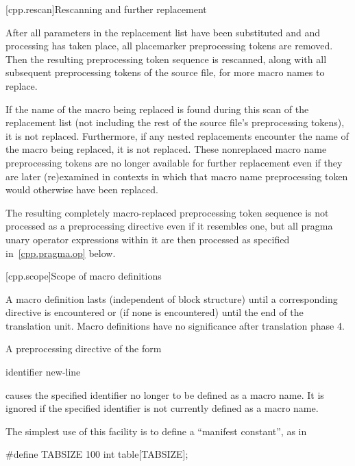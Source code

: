 [cpp.rescan]{Rescanning and further replacement}%
%

\pnum
After all parameters in the replacement list have been substituted and \tcode{\#} and \tcode{\#\#} processing has taken
place, all placemarker preprocessing tokens are removed. Then
the resulting preprocessing token sequence is rescanned, along with all
subsequent preprocessing tokens of the source file, for more macro names
to replace.

\pnum
If the name of the macro being replaced is found during this scan of
the replacement list
(not including the rest of the source file's preprocessing tokens),
it is not replaced.
Furthermore,
if any nested replacements encounter the name of the macro being replaced,
it is not replaced.
These nonreplaced macro name preprocessing tokens are no longer available
for further replacement even if they are later (re)examined in contexts
in which that macro name preprocessing token would otherwise have been
replaced.

\pnum
The resulting completely macro-replaced preprocessing token sequence
is not processed as a preprocessing directive even if it resembles one,
but all pragma unary operator expressions within it are then processed as
specified in~\ref{cpp.pragma.op} below.

[cpp.scope]{Scope of macro definitions}%
%

\pnum
A macro definition lasts
(independent of block structure)
until a corresponding
directive is encountered or
(if none is encountered)
until the end of the translation unit.
Macro definitions have no significance after translation phase 4.

\pnum
A preprocessing directive of the form

\begin{ncsimplebnf}
 identifier new-line
%
\end{ncsimplebnf}

causes the specified identifier no longer to be defined as a macro name.
It is ignored if the specified identifier is not currently defined as
a macro name.

\pnum
\begin{example}
The simplest use of this facility is to define a ``manifest constant'',
as in
\begin{codeblock}
#define TABSIZE 100
int table[TABSIZE];
\end{codeblock}
\end{example}

